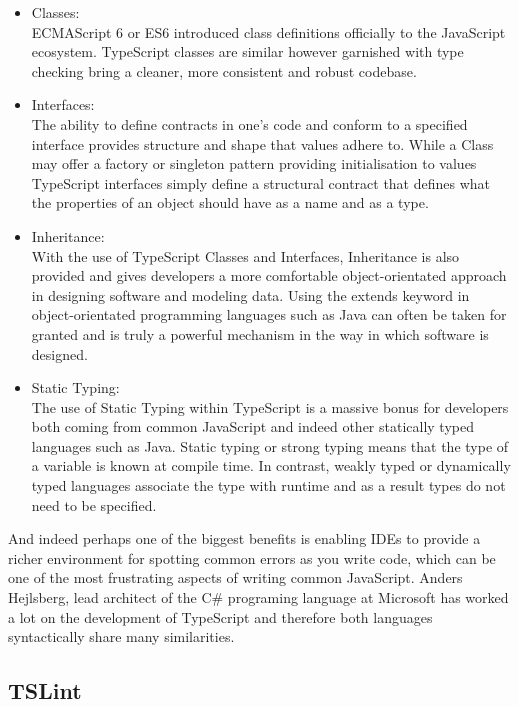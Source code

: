 \begin{itemize}
\item{Classes:} \\
ECMAScript 6 or ES6 introduced class definitions officially to the JavaScript ecosystem. TypeScript classes are similar however garnished with type checking bring a cleaner, more consistent and robust codebase. 
\item{Interfaces:} \\
The ability to define contracts in one's code and conform to a specified interface provides structure and shape that values adhere to. While a Class may offer a factory or singleton\cite{Gamma:1995:DPE:186897} pattern providing initialisation to values TypeScript interfaces simply define a structural contract that defines what the properties of an object should have as a name and as a type.
\item{Inheritance:} \\
With the use of TypeScript Classes and Interfaces, Inheritance is also provided and gives developers a more comfortable object-orientated approach in designing software and modeling data. Using the extends keyword in object-orientated programming languages such as Java can often be taken for granted and is truly a powerful mechanism in the way in which software is designed.
\item{Static Typing:} \\
The use of Static Typing within TypeScript is a massive bonus for developers both coming from common JavaScript and indeed other statically typed languages such as Java. Static typing or strong typing means that the type of a variable is known at compile time. In contrast, weakly typed or dynamically typed languages associate the type with runtime and as a result types do not need to be specified.
\end{itemize}

And indeed perhaps one of the biggest benefits is enabling IDEs to provide a richer environment for spotting common errors as you write code, which can be one of the most frustrating aspects of writing common JavaScript. Anders Hejlsberg, lead architect of the C\# programing language at Microsoft has worked a lot on the development of TypeScript and therefore both languages syntactically share many similarities\cite{andershejlsberg}.

\subsection{TSLint}

